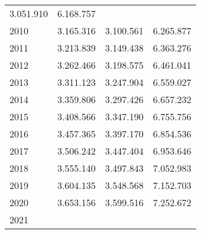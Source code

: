 \begin{tabular}{llll}
  \multicolumn{1}{r}{3.051.910} &
  \multicolumn{1}{r}{6.168.757} \\
\multicolumn{1}{l}{\hspace{1em}2010} &
  \multicolumn{1}{|r}{3.165.316} &
  \multicolumn{1}{r}{3.100.561} &
  \multicolumn{1}{r}{6.265.877} \\
\multicolumn{1}{l}{\hspace{1em}2011} &
  \multicolumn{1}{|r}{3.213.839} &
  \multicolumn{1}{r}{3.149.438} &
  \multicolumn{1}{r}{6.363.276} \\
\multicolumn{1}{l}{\hspace{1em}2012} &
  \multicolumn{1}{|r}{3.262.466} &
  \multicolumn{1}{r}{3.198.575} &
  \multicolumn{1}{r}{6.461.041} \\
\multicolumn{1}{l}{\hspace{1em}2013} &
  \multicolumn{1}{|r}{3.311.123} &
  \multicolumn{1}{r}{3.247.904} &
  \multicolumn{1}{r}{6.559.027} \\
\multicolumn{1}{l}{\hspace{1em}2014} &
  \multicolumn{1}{|r}{3.359.806} &
  \multicolumn{1}{r}{3.297.426} &
  \multicolumn{1}{r}{6.657.232} \\
\multicolumn{1}{l}{\hspace{1em}2015} &
  \multicolumn{1}{|r}{3.408.566} &
  \multicolumn{1}{r}{3.347.190} &
  \multicolumn{1}{r}{6.755.756} \\
\multicolumn{1}{l}{\hspace{1em}2016} &
  \multicolumn{1}{|r}{3.457.365} &
  \multicolumn{1}{r}{3.397.170} &
  \multicolumn{1}{r}{6.854.536} \\
\multicolumn{1}{l}{\hspace{1em}2017} &
  \multicolumn{1}{|r}{3.506.242} &
  \multicolumn{1}{r}{3.447.404} &
  \multicolumn{1}{r}{6.953.646} \\
\multicolumn{1}{l}{\hspace{1em}2018} &
  \multicolumn{1}{|r}{3.555.140} &
  \multicolumn{1}{r}{3.497.843} &
  \multicolumn{1}{r}{7.052.983} \\
\multicolumn{1}{l}{\hspace{1em}2019} &
  \multicolumn{1}{|r}{3.604.135} &
  \multicolumn{1}{r}{3.548.568} &
  \multicolumn{1}{r}{7.152.703} \\
\multicolumn{1}{l}{\hspace{1em}2020} &
  \multicolumn{1}{|r}{3.653.156} &
  \multicolumn{1}{r}{3.599.516} &
  \multicolumn{1}{r}{7.252.672} \\
\multicolumn{1}{l}{\hspace{1em}2021} &

\end{tabular}
